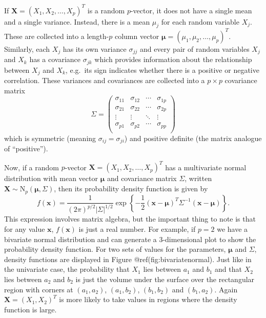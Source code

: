 \documentclass[
]{article}
\begin{document}
If \(\boldsymbol{X} = ( X_1, X_2, \ldots, X_p )^T\) is a random
\(p\)-vector, it does not have a single mean and a single variance.
Instead, there is a mean \(\mu_j\) for each random variable \(X_j\).
These are collected into a length-\(p\) column vector
\(\boldsymbol{\mu} = (\mu_1, \mu_2, \ldots, \mu_p)^T\). Similarly, each
\(X_j\) has its own variance \(\sigma_{jj}\) and every pair of random
variables \(X_j\) and \(X_k\) has a covariance \(\sigma_{jk}\) which
provides information about the relationship between \(X_j\) and \(X_k\),
e.g.~its sign indicates whether there is a positive or negative
correlation. These variances and covariances are collected into a
\(p \times p\) covariance matrix \begin{equation*}
\Sigma = 
\begin{pmatrix}
\sigma_{11} &\sigma_{12} &\cdots &\sigma_{1p}\\
\sigma_{21} &\sigma_{22} &\cdots &\sigma_{2p}\\
\vdots &\vdots &\ddots &\vdots\\
\sigma_{p1} &\sigma_{p2} &\cdots &\sigma_{pp}\\
\end{pmatrix}
\end{equation*} which is symmetric (meaning
\(\sigma_{ij} = \sigma_{ji}\)) and positive definite (the matrix
analogue of ``positive'').

Now, if a random \(p\)-vector
\(\boldsymbol{X} = ( X_1, X_2, \ldots, X_p )^T\) has a multivariate
normal distribution with mean vector \(\boldsymbol{\mu}\) and covariance
matrix \(\Sigma\), written
\(\boldsymbol{X} \sim \mathrm{N}_p(\boldsymbol{\mu}, \Sigma)\), then its
probability density function is given by \begin{equation*}
f(\boldsymbol{x}) = \frac{1}{(2 \pi)^{p/2} | \Sigma |^{1/2}} \exp \left\{ -\frac{1}{2} (\boldsymbol{x} - \boldsymbol{\mu})^T \Sigma^{-1} (\boldsymbol{x} - \boldsymbol{\mu}) \right\}.
\end{equation*} This expression involves matrix algebra, but the
important thing to note is that for any value \(\boldsymbol{x}\),
\(f(\boldsymbol{x})\) is just a real number. For example, if \(p=2\) we
have a bivariate normal distribution and can generate a 3-dimensional
plot to show the probability density function. For two sets of values
for the parameters, \(\boldsymbol{\mu}\) and \(\Sigma\), density
functions are displayed in Figure @ref(fig:bivariatenormal). Just like
in the univariate case, the probability that \(X_1\) lies between
\(a_1\) and \(b_1\) and that \(X_2\) lies between \(a_2\) and \(b_2\) is
just the volume under the surface over the rectangular region with
corners at \((a_1, a_2)\), \((a_1, b_2)\), \((b_1, b_2)\) and
\((b_1, a_2)\). Again \(\boldsymbol{X}=(X_1, X_2)^T\) is more likely to
take values in regions where the density function is large.
\end{document}
